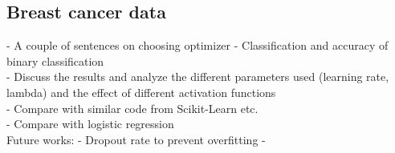 \subsection{Breast cancer data}
- A couple of sentences on choosing optimizer
- Classification and accuracy of binary classification\\
- Discuss the results and analyze the different parameters used (learning rate, lambda) and the effect of different activation functions\\
- Compare with similar code from Scikit-Learn etc.\\
- Compare with logistic regression\\



Future works: 
- Dropout rate to prevent overfitting
- 